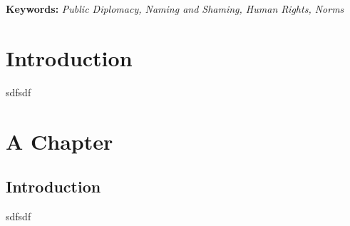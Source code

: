 \documentclass{ucetd}
\date{Graduation Date}
\title{\thesistitle}
\author{\thesisauthor}
\begin{document}

\maketitle

\abstract
\textbf{Keywords:}\textit{ Public Diplomacy, Naming and Shaming, Human Rights, Norms}

\tableofcontents
\listoffigures
\listoftables

\acknowledgments


\mainmatter

\chapter{Introduction}
sdfsdf
\chapter{A Chapter}
\section{Introduction}
sdfsdf
\makebibliography
\nocite{*}

%
%
\end{document}
